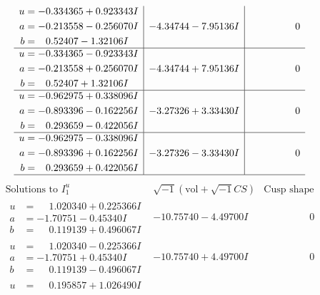 \documentclass[1p]{elsarticle_modified}
\theoremstyle{definition}
\newcommand{\I}{\sqrt{-1}}
\begin{document}
$$\begin{array}{c|c|c}
\begin{aligned}
u &= -0.334365 + 0.923343 I \\
a &= -0.213558 - 0.256070 I \\
b &= \phantom{-}0.52407 - 1.32106 I\end{aligned}
 & -4.34744 - 7.95136 I & \phantom{-0.000000 } 0 \\ \hline\begin{aligned}
u &= -0.334365 - 0.923343 I \\
a &= -0.213558 + 0.256070 I \\
b &= \phantom{-}0.52407 + 1.32106 I\end{aligned}
 & -4.34744 + 7.95136 I & \phantom{-0.000000 } 0 \\ \hline\begin{aligned}
u &= -0.962975 + 0.338096 I \\
a &= -0.893396 - 0.162256 I \\
b &= \phantom{-}0.293659 - 0.422056 I\end{aligned}
 & -3.27326 + 3.33430 I & \phantom{-0.000000 } 0 \\ \hline\begin{aligned}
u &= -0.962975 - 0.338096 I \\
a &= -0.893396 + 0.162256 I \\
b &= \phantom{-}0.293659 + 0.422056 I\end{aligned}
 & -3.27326 - 3.33430 I & \phantom{-0.000000 } 0\\
 \hline 
 \end{array}$$\newpage$$\begin{array}{c|c|c}  
\text{Solutions to }I^u_{1}& \I (\text{vol} + \sqrt{-1}CS) & \text{Cusp shape}\\
 \hline 
\begin{aligned}
u &= \phantom{-}1.020340 + 0.225366 I \\
a &= -1.70751 - 0.45340 I \\
b &= \phantom{-}0.119139 + 0.496067 I\end{aligned}
 & -10.75740 - 4.49700 I & \phantom{-0.000000 } 0 \\ \hline\begin{aligned}
u &= \phantom{-}1.020340 - 0.225366 I \\
a &= -1.70751 + 0.45340 I \\
b &= \phantom{-}0.119139 - 0.496067 I\end{aligned}
 & -10.75740 + 4.49700 I & \phantom{-0.000000 } 0 \\ \hline\begin{aligned}
u &= \phantom{-}0.195857 + 1.026490 I \\

\end{aligned}
\end{array}$$
\end{document}
